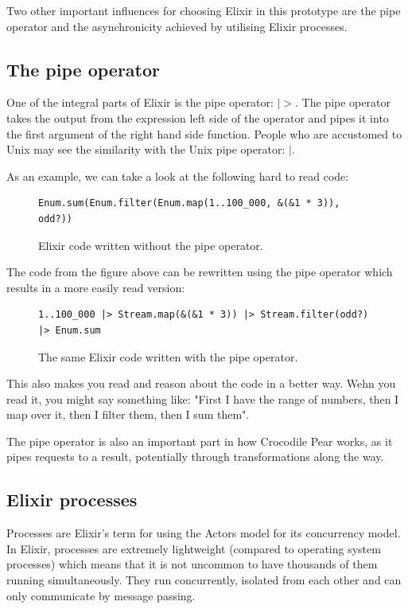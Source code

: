 \documentclass{cslthse-msc}
\begin{document}
Two other important influences for choosing Elixir in this prototype are the pipe operator and the asynchronicity achieved by utilising Elixir processes.

\subsection{The pipe operator}
One of the integral parts of Elixir is the pipe operator: $|>$. The pipe operator takes the output from the expression left side of the operator and pipes it into the first argument of the right hand side function. People who are accustomed to Unix may see the similarity with the Unix pipe operator: $|$.

As an example, we can take a look at the following hard to read code:

\begin{figure}[H]
  \centering
\begin{lstlisting}[breaklines=true,frame=single]
Enum.sum(Enum.filter(Enum.map(1..100_000, &(&1 * 3)), odd?))
\end{lstlisting}
  \caption{Elixir code written without the pipe operator.}
\end{figure}

The code from the figure above can be rewritten using the pipe operator which results in a more easily read version:

\begin{figure}[H]
  \centering
\begin{lstlisting}[breaklines=true,frame=single]
1..100_000 |> Stream.map(&(&1 * 3)) |> Stream.filter(odd?) |> Enum.sum
\end{lstlisting}
  \caption{The same Elixir code written with the pipe operator.}
\end{figure}

This also makes you read and reason about the code in a better way. Wehn you read it, you might say something like: "First I have the range of numbers, then I map over it, then I filter them, then I sum them".

The pipe operator is also an important part in how Crocodile Pear works, as it pipes requests to a result, potentially through transformations along the way.

\subsection{Elixir processes}
Processes are Elixir's term for using the Actors model for its concurrency model. In Elixir, processes are extremely lightweight (compared to operating system processes) which means that it is not uncommon to have thousands of them running simultaneously. They run concurrently, isolated from each other and can only communicate by message passing\cite{elixir_processes}.
\end{document}
